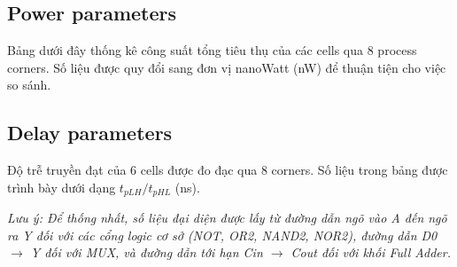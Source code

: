 \documentclass[12pt, a4paper, oneside]{article}
\begin{document}
\subsection{Power parameters}

Bảng dưới đây thống kê công suất tổng tiêu thụ của các cells qua 8 process corners. Số liệu được quy đổi sang đơn vị nanoWatt (nW) để thuận tiện cho việc so sánh.

\begin{table}[H]
    \centering
    \caption{Total Power parameters (nW) của các cells qua 8 corners}
    \label{tab:exp1_power}
\end{table}

\subsection{Delay parameters}

Độ trễ truyền đạt của 6 cells được đo đạc qua 8 corners. Số liệu trong bảng được trình bày dưới dạng $t_{pLH} / t_{pHL}$ (ns). 

\textit{Lưu ý: Để thống nhất, số liệu đại diện được lấy từ đường dẫn ngõ vào A đến ngõ ra Y đối với các cổng logic cơ sở (NOT, OR2, NAND2, NOR2), đường dẫn D0 $\rightarrow$ Y đối với MUX, và đường dẫn tới hạn Cin $\rightarrow$ Cout đối với khối Full Adder.}
\end{document}
